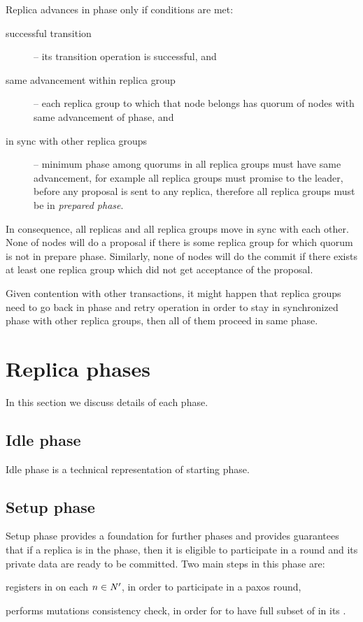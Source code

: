 Replica advances in phase only if conditions are met: \begin{description}
\item[successful transition] -- its transition operation is successful, and
\item[same advancement within replica group] -- each replica group to which that node belongs has quorum of nodes with same advancement of phase, and
\item[in sync with other replica groups] -- minimum phase among quorums in all replica groups must have same advancement, for example all replica groups must promise to the leader, before any proposal is sent to any replica, therefore all replica groups must be in \emph{prepared phase}.
\end{description}


In consequence, all replicas and all replica groups move in sync with each other. None of nodes will do a proposal if there is some replica group for which quorum is not in prepare phase. 
Similarly, none of nodes will do the commit if there exists at least one replica group which did not get acceptance of the proposal.  

Given contention with other transactions, it might happen that replica groups need to go back in phase and retry operation in order to stay in synchronized phase with other replica groups, then all of them proceed in same phase.

\section{Replica phases}
In this section we discuss details of each phase.

\subsection{Idle phase}
Idle phase is a technical representation of starting phase.

\subsection{Setup phase}
Setup phase provides a foundation for further phases and provides guarantees that if a replica is in the phase, then it is eligible to participate in a \paxos round and its private data are ready to be committed. Two main steps in this phase are: \begin{enumerate*}
\item \transaction registers in \txIndex on each $n\in \text{$\mathit{N'}$}$, in order to participate in a paxos round,
\item \transaction performs mutations consistency check, in order for  to have full subset of \mutations in its \txStorage.
\end{enumerate*}


